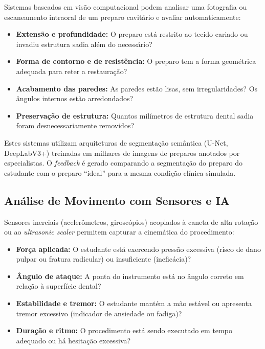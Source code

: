 Sistemas baseados em visão computacional podem analisar uma fotografia ou
escaneamento intraoral de um preparo cavitário e avaliar automaticamente:

\begin{itemize}
  \item \textbf{Extensão e profundidade:} O preparo está restrito ao tecido
    cariado ou invadiu estrutura sadia além do necessário?
  \item \textbf{Forma de contorno e de resistência:} O preparo tem a forma
    geométrica adequada para reter a restauração?
  \item \textbf{Acabamento das paredes:} As paredes estão lisas, sem
    irregularidades? Os ângulos internos estão arredondados?
  \item \textbf{Preservação de estrutura:} Quantos milímetros de estrutura
    dental sadia foram desnecessariamente removidos?
\end{itemize}

Estes sistemas utilizam arquiteturas de segmentação semântica (U-Net,
DeepLabV3+) treinadas em milhares de imagens de preparos anotados por
especialistas. O \textit{feedback} é gerado comparando a segmentação do preparo
do estudante com o preparo ``ideal'' para a mesma condição clínica simulada.

\subsection{Análise de Movimento com Sensores e IA}

Sensores inerciais (acelerômetros, giroscópios) acoplados à caneta de alta
rotação ou ao \textit{ultrasonic scaler} permitem capturar a cinemática do
procedimento:

\begin{itemize}
  \item \textbf{Força aplicada:} O estudante está exercendo pressão excessiva
    (risco de dano pulpar ou fratura radicular) ou insuficiente (ineficácia)?
  \item \textbf{Ângulo de ataque:} A ponta do instrumento está no ângulo
    correto em relação à superfície dental?
  \item \textbf{Estabilidade e tremor:} O estudante mantém a mão estável ou
    apresenta tremor excessivo (indicador de ansiedade ou fadiga)?
  \item \textbf{Duração e ritmo:} O procedimento está sendo executado em tempo
    adequado ou há hesitação excessiva?
\end{itemize}

